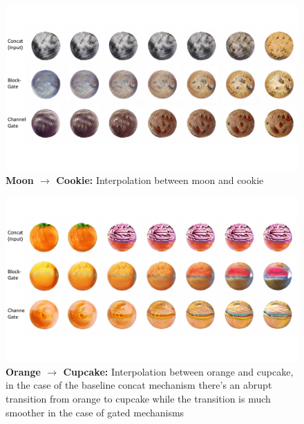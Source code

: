 \documentclass[10pt,twocolumn,letterpaper]{article}
\begin{document}
\begin{figure}[t]
    \centering
    \includegraphics[width=\linewidth]{interpolation-cookie-moon.pdf}
    \caption{ {\bf Moon $\rightarrow$ Cookie:} Interpolation between moon and cookie }
    \label{fig:inter_cookie_moon}
    \vspace{-3mm}
\end{figure}

\begin{figure}[t]
    \centering
    \includegraphics[width=\linewidth]{interpolation-orange-cupcake.pdf}
    \caption{ {\bf Orange $\rightarrow$ Cupcake:} Interpolation between orange and cupcake, in the case of the baseline concat mechanism there's an abrupt transition from orange to cupcake while the transition is much smoother in the case of gated mechanisms }
    \label{fig:inter_orange_cupcake}
    \vspace{-3mm}
\end{figure}
\end{document}

